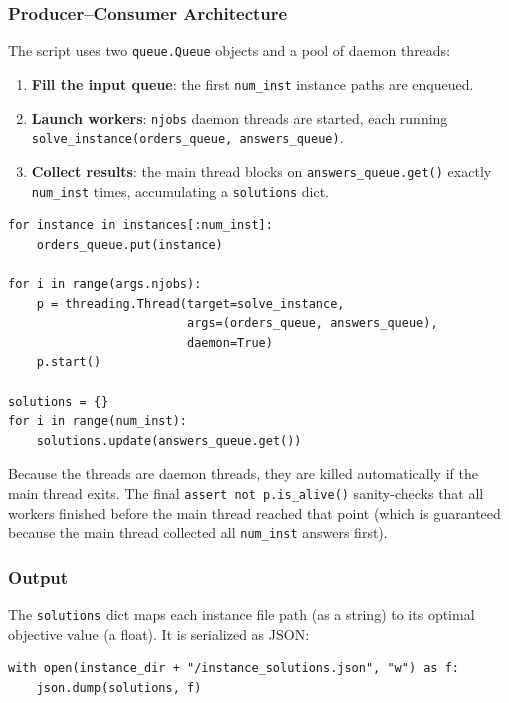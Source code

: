 \subsubsection{Producer--Consumer Architecture}

The script uses two \texttt{queue.Queue} objects and a pool of daemon threads:

\begin{enumerate}
    \item \textbf{Fill the input queue}: the first \texttt{num\_inst} instance paths are enqueued.
    \item \textbf{Launch workers}: \texttt{njobs} daemon threads are started, each running \texttt{solve\_instance(orders\_queue, answers\_queue)}.
    \item \textbf{Collect results}: the main thread blocks on \texttt{answers\_queue.get()} exactly \texttt{num\_inst} times, accumulating a \texttt{solutions} dict.
\end{enumerate}

\begin{lstlisting}
for instance in instances[:num_inst]:
    orders_queue.put(instance)

for i in range(args.njobs):
    p = threading.Thread(target=solve_instance,
                         args=(orders_queue, answers_queue),
                         daemon=True)
    p.start()

solutions = {}
for i in range(num_inst):
    solutions.update(answers_queue.get())
\end{lstlisting}

Because the threads are daemon threads, they are killed automatically if the main thread exits. The final \texttt{assert not p.is\_alive()} sanity-checks that all workers finished before the main thread reached that point (which is guaranteed because the main thread collected all \texttt{num\_inst} answers first).

\subsubsection{Output}

The \texttt{solutions} dict maps each instance file path (as a string) to its optimal objective value (a float). It is serialized as JSON:

\begin{lstlisting}
with open(instance_dir + "/instance_solutions.json", "w") as f:
    json.dump(solutions, f)
\end{lstlisting}


